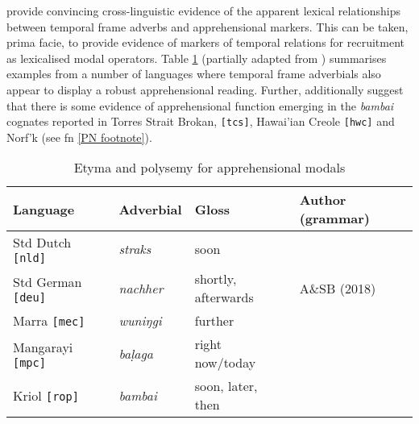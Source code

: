 \citet{Angelo2016,Angelo2018} provide convincing cross-linguistic evidence of the apparent lexical relationships between temporal frame adverbs and apprehensional markers. This can be taken, prima facie, to provide evidence of markers of temporal relations for recruitment as lexicalised modal operators. Table \ref{etyma} (partially adapted from \citet{Angelo2016,Angelo2018}) summarises examples from a number of languages where temporal frame adverbials also appear to display a robust apprehensional reading. Further, \citet[288]{Angelo2016} additionally suggest that there is some evidence of apprehensional function emerging in the \textit{bambai} cognates reported in Torres Strait Brokan,	 \texttt{[tcs]}, Hawai'ian Creole \texttt{[hwc]} and Norf'k (see fn \ref{PN footnote}).

\begin{table}[h!]\centering
	\caption{Etyma and polysemy for apprehensional modals} \label{etyma}
	\begin{tabular}{llll}
		Language & Adverbial & Gloss\footnotemark & Author (grammar)\\\midrule
		Std Dutch \texttt{[nld]} & \textit{straks} & soon & \citet{Boogaart2009,Boogaart2020}\\
		Std German \texttt{[deu]} & \textit{nachher} & shortly, afterwards&A\&SB (2018)\\
		Marra \texttt{[mec]}& \textit{wuniŋgi} & further & \citet{Heath1981}\\
		Mangarayi \texttt{[mpc]} & \textit{baḷaga} & right now/today & \citet{Merlan1989}\\ 
		Kriol \texttt{[rop]} &  \textit{bambai} & soon, later, then& \\\bottomrule
	\end{tabular}\end{table}
	\vspace{.25cm}


 

